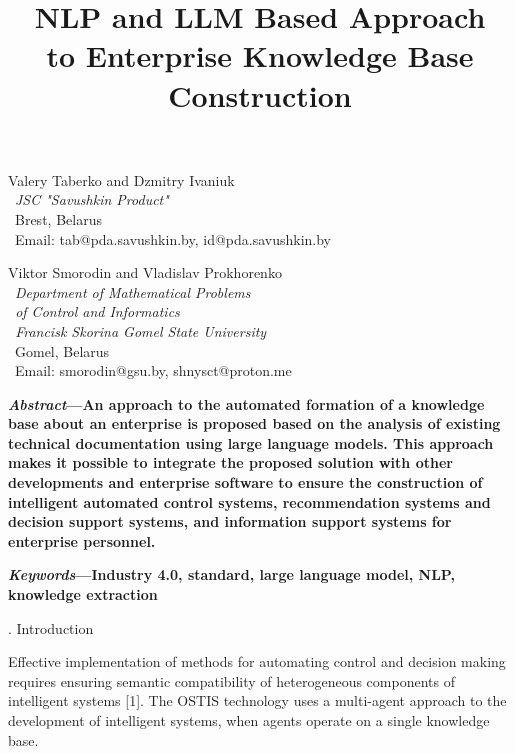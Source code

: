\documentclass{article}
\begin{document}
\setcounter{page}{177}
\title{\textbf{NLP and LLM Based Approach\\
to Enterprise Knowledge Base Construction
}}
\author{}
\date{}
\maketitle
\begin{SCn}
\begin{multicols}{2}
\begin{center}
Valery Taberko and Dzmitry Ivaniuk\\\
\textit{JSC "Savushkin Product" }\\\
Brest, Belarus\\\ 
Email: tab@pda.savushkin.by, id@pda.savushkin.by
\end{center}

    \vfill
    \columnbreak
    \begin{center}
Viktor Smorodin and Vladislav Prokhorenko\\\
\textit{Department of Mathematical Problems\\\
of Control and Informatics\\\
Francisk Skorina Gomel State University}\\\
Gomel, Belarus\\\
Email: smorodin@gsu.by, shnysct@proton.me  
 \end{center}
\end{multicols}
\begin{multicols}
\justifying
   \textbf{\textit{Abstract}—An approach to the automated formation of a
knowledge base about an enterprise is proposed based on
the analysis of existing technical documentation using large
language models. This approach makes it possible to integrate the proposed solution with other developments and
enterprise software to ensure the construction of intelligent
automated control systems, recommendation systems and
decision support systems, and information support systems
for enterprise personnel.}

\textbf{\textit{Keywords}—Industry 4.0, standard, large language model,
NLP, knowledge extraction}
\begin{center}
{\MakeUppercase{\romannumeral 1.}}
Introduction
\end{center}

Effective implementation of methods for automating
control and decision making requires ensuring semantic
compatibility of heterogeneous components of intelligent
systems [1]. The OSTIS technology uses a multi-agent
approach to the development of intelligent systems, when
agents operate on a single knowledge base.


\end{multicols}
\end{SCn}
\end{document}

